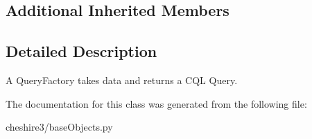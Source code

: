 \subsection*{Additional Inherited Members}


\subsection{Detailed Description}
\begin{DoxyVerb}A QueryFactory takes data and returns a CQL Query.\end{DoxyVerb}
 

The documentation for this class was generated from the following file\-:\begin{DoxyCompactItemize}
\item 
cheshire3/base\-Objects.\-py\end{DoxyCompactItemize}
